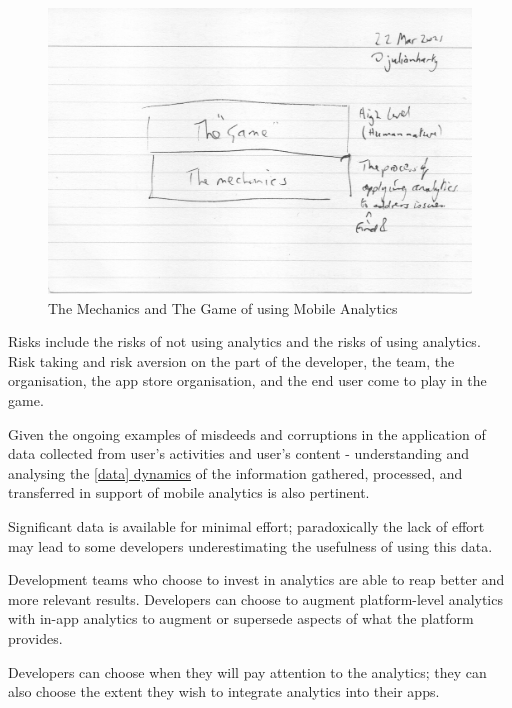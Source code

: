 \begin{figure}
    \centering
    \includegraphics[width=15cm]{images/rough-sketches/The-Mechanics-The-Game.jpeg}
    \caption{The Mechanics and The Game of using Mobile Analytics}
    \label{fig:the-mechanics-the-game}
\end{figure}


Risks include the risks of not using analytics and the risks of using analytics. Risk taking and risk aversion on the part of the developer, the team, the organisation, the app store organisation, and the end user come to play in the game.

Given the ongoing examples of misdeeds and corruptions in the application of data collected from user's activities and user's content - understanding and analysing the \href{glossary_data_dynamics}{[data] dynamics} of the information gathered, processed, and transferred in support of mobile analytics is also pertinent.

Significant data is available for minimal effort; paradoxically the lack of effort may lead to some developers underestimating the usefulness of using this data.

Development teams who choose to invest in analytics are able to reap better and more relevant results. Developers can choose to augment platform-level analytics with in-app analytics to augment or supersede aspects of what the platform provides.

Developers can choose when they will pay attention to the analytics; they can also choose the extent they wish to integrate analytics into their apps. 

